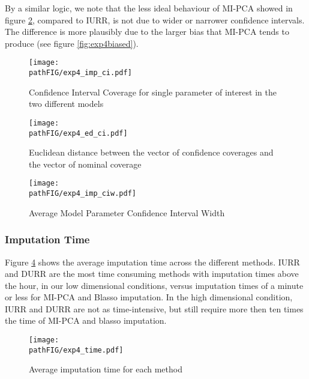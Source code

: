 	By a similar logic, we note that the less ideal behaviour of MI-PCA showed in figure \ref{fig:exp4cied}, 
	compared to IURR, is not due to wider or narrower confidence intervals.
	The difference is more plausibly due to the larger bias that MI-PCA tends to produce (see figure 
	\ref{fig:exp4biased}).

\begin{figure}
	\centering
	\texttt{[image: \\pathFIG/exp4\_imp\_ci.pdf]}
	\caption{Confidence Interval Coverage for single parameter of interest in the two 
		different models}
	\label{fig:exp4ci}
\end{figure}

\begin{figure}
	\centering
	\texttt{[image: \\pathFIG/exp4\_ed\_ci.pdf]}
	\caption{Euclidean distance between the vector of confidence coverages and the vector of 
		nominal coverage}
	\label{fig:exp4cied}
\end{figure}

\begin{figure}
	\centering
	\texttt{[image: \\pathFIG/exp4\_imp\_ciw.pdf]}
	\caption{Average Model Parameter Confidence Interval Width}
	\label{fig:exp4ciw}
\end{figure}


\subsubsection{Imputation Time}

	Figure \ref{fig:exp4time} shows the average imputation time across the different methods.
	IURR and DURR are the most time consuming methods with imputation times above the hour, 
	in our low dimensional conditions, versus imputation times of a minute or less for MI-PCA and 
	Blasso imputation.
	In the high dimensional condition, IURR and DURR are not as time-intensive, but still 
	require more then ten times the time of MI-PCA and blasso imputation.

\begin{figure}
	\centering
	\texttt{[image: \\pathFIG/exp4\_time.pdf]}
	\caption{Average imputation time for each method}
	\label{fig:exp4time}
\end{figure}

\FloatBarrier


